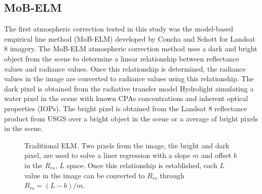 \documentclass[]{spie}  %
\begin{document}
\subsection{MoB-ELM}
The first atmospheric correction tested in this study was the model-based empirical line method (MoB-ELM) developed by Concha and Schott\cite{Concha2014SPIE} for Landsat 8 imagery. The MoB-ELM atmospheric correction method uses a dark and bright object from the scene to determine a linear relationship between reflectance values and radiance values. Once this relationship is determined, the radiance values in the image are converted to radiance values using this relationship. The dark pixel is obtained from the radiative transfer model Hydrolight simulating  a water pixel in the scene with known CPAs concentrations and  inherent optical properties (IOPs). The bright pixel is obtained from the Landsat 8 reflectance product from USGS over a bright object in the scene or a average of bright pixels in the scene.
\begin{figure}[htb]
	\centering
\caption{Traditional ELM. Two pixels from the image, the bright and dark pixel, are used to solve a liner regression with a slope $m$ and offset $b$ in the $R_{rs}$, $L$ space. Once this relationship is established, each $L$ value in the image can be converted to $R_{rs}$ through $R_{rs}=(L-b)/m$. \label{fig:ELMregression}}
\end{figure}
\end{document}
